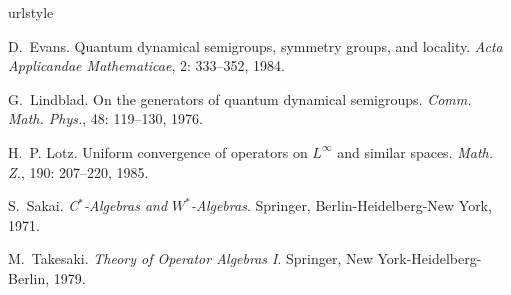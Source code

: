 
\begin{thebibliography}{5}
\providecommand{\natexlab}[1]{#1}
\providecommand{\url}[1]{\texttt{#1}}
\expandafter\ifx\csname urlstyle\endcsname\relax
  \providecommand{\doi}[1]{doi: #1}\else
  \providecommand{\doi}{doi: \begingroup \urlstyle{rm}\Url}\fi

D.~Evans.
\newblock Quantum dynamical semigroups, symmetry groups, and locality.
\newblock \emph{Acta Applicandae Mathematicae}, 2: 333--352, 1984.

G.~Lindblad.
\newblock On the generators of quantum dynamical semigroups.
\newblock \emph{Comm. Math. Phys.}, 48: 119--130, 1976.

H.~P. Lotz.
\newblock Uniform convergence of operators on {$L^{\infty}$} and similar
  spaces.
\newblock \emph{Math. Z.}, 190: 207--220, 1985.

S.~Sakai.
\newblock \emph{{C$^{*}$}-Algebras and {$W^*$}-Algebras}.
\newblock Springer, Berlin-Heidelberg-New York, 1971.

M.~Takesaki.
\newblock \emph{Theory of Operator Algebras {I}}.
\newblock Springer, New York-Heidelberg-Berlin, 1979.

\end{thebibliography}